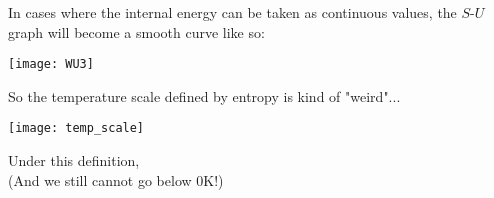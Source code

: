 \documentclass[class=article, crop=false, 12pt]{standalone}
\begin{document}
\newpage
In cases where the internal energy can be taken as continuous values,
the $S$-$U$ graph will become a smooth curve like so:

\begin{center}
    \begin{minipage}{0.8\linewidth}
        \centering
        \texttt{[image: WU3]}
    \end{minipage}
\end{center}

So the temperature scale defined by entropy is kind of "weird"...

\begin{center}
    \begin{minipage}{0.7\linewidth}
        \centering
        \texttt{[image: temp\_scale]}
    \end{minipage}
\end{center}

Under this definition,
\\

(And we still cannot go below $0$K!)


\theend
\end{document}
